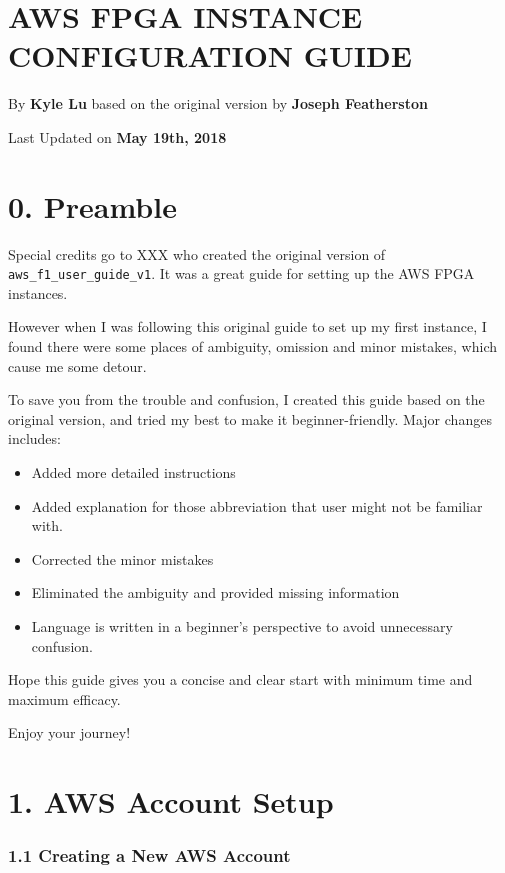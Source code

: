 \documentclass[]{article}
\date{}
\begin{document}
\hypertarget{header-n0}{%
\section{AWS FPGA INSTANCE CONFIGURATION GUIDE}\label{header-n0}}

By \textbf{Kyle Lu} based on the original version by \textbf{Joseph
Featherston}

Last Updated on \textbf{May 19th, 2018}

\tableofcontents

\hypertarget{header-n13}{%
\section{0. Preamble}\label{header-n13}}

Special credits go to XXX who created the original version of
\texttt{aws\_f1\_user\_guide\_v1}. It was a great guide for setting up
the AWS FPGA instances.

However when I was following this original guide to set up my first
instance, I found there were some places of ambiguity, omission and
minor mistakes, which cause me some detour.

To save you from the trouble and confusion, I created this guide based
on the original version, and tried my best to make it beginner-friendly.
Major changes includes:

\begin{itemize}
\item
  Added more detailed instructions 
\item
  Added explanation for those abbreviation that user might not be
  familiar with.
\item
  Corrected the minor mistakes
\item
  Eliminated the ambiguity and provided missing information
\item
  Language is written in a beginner's perspective to avoid unnecessary
  confusion.
\end{itemize}

Hope this guide gives you a concise and clear start with minimum time
and maximum efficacy.

Enjoy your journey!

\hypertarget{header-n42}{%
\section{1. AWS Account Setup}\label{header-n42}}

\hypertarget{header-n45}{%
\subsubsection{1.1 Creating a New AWS Account}\label{header-n45}}
\end{document}
